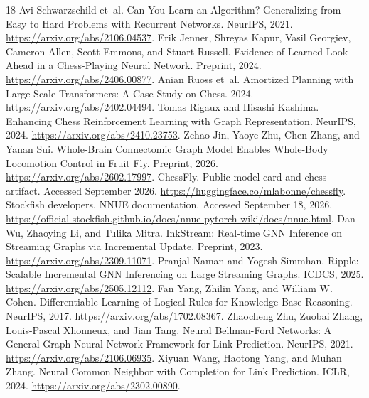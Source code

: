 \documentclass{article}
\begin{document}
\begingroup\raggedright
\begin{thebibliography}{18}
Avi Schwarzschild et~al. Can You Learn an Algorithm? Generalizing from Easy to
Hard Problems with Recurrent Networks. NeurIPS, 2021.
\url{https://arxiv.org/abs/2106.04537}.
Erik Jenner, Shreyas Kapur, Vasil Georgiev, Cameron Allen, Scott Emmons, and
Stuart Russell. Evidence of Learned Look-Ahead in a Chess-Playing Neural
Network. Preprint, 2024. \url{https://arxiv.org/abs/2406.00877}.
Anian Ruoss et~al. Amortized Planning with Large-Scale Transformers: A Case Study
on Chess. 2024. \url{https://arxiv.org/abs/2402.04494}.
Tomas Rigaux and Hisashi Kashima. Enhancing Chess Reinforcement Learning with
Graph Representation. NeurIPS, 2024. \url{https://arxiv.org/abs/2410.23753}.
Zehao Jin, Yaoye Zhu, Chen Zhang, and Yanan Sui. Whole-Brain Connectomic Graph
Model Enables Whole-Body Locomotion Control in Fruit Fly. Preprint, 2026.
\url{https://arxiv.org/abs/2602.17997}.
ChessFly. Public model card and chess artifact. Accessed September 2026.
\url{https://huggingface.co/mlabonne/chessfly}.
Stockfish developers. NNUE documentation. Accessed September 18, 2026.
\url{https://official-stockfish.github.io/docs/nnue-pytorch-wiki/docs/nnue.html}.
Dan Wu, Zhaoying Li, and Tulika Mitra. InkStream: Real-time GNN Inference on
Streaming Graphs via Incremental Update. Preprint, 2023.
\url{https://arxiv.org/abs/2309.11071}.
Pranjal Naman and Yogesh Simmhan. Ripple: Scalable Incremental GNN Inferencing on
Large Streaming Graphs. ICDCS, 2025. \url{https://arxiv.org/abs/2505.12112}.
Fan Yang, Zhilin Yang, and William W. Cohen. Differentiable Learning of Logical
Rules for Knowledge Base Reasoning. NeurIPS, 2017.
\url{https://arxiv.org/abs/1702.08367}.
Zhaocheng Zhu, Zuobai Zhang, Louis-Pascal Xhonneux, and Jian Tang.
Neural Bellman-Ford Networks: A General Graph Neural Network Framework for Link
Prediction. NeurIPS, 2021. \url{https://arxiv.org/abs/2106.06935}.
Xiyuan Wang, Haotong Yang, and Muhan Zhang. Neural Common Neighbor with Completion
for Link Prediction. ICLR, 2024. \url{https://arxiv.org/abs/2302.00890}.

\end{thebibliography}
\end{document}
